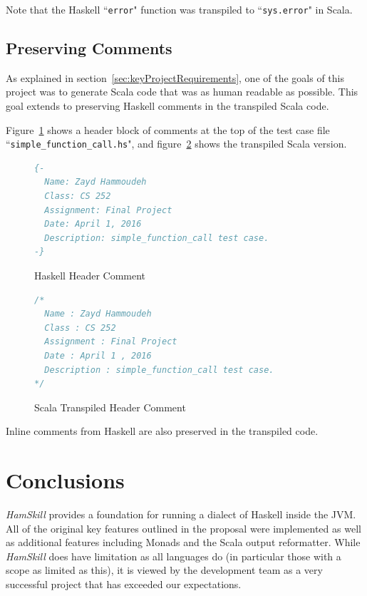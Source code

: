 \documentclass{report}
\begin{document}
Note that the Haskell ``\texttt{error}" function was transpiled to ``\texttt{sys.error}" in Scala.

\subsection{Preserving Comments}\label{sec:preservingComments}

As explained in section~\ref{sec:keyProjectRequirements}, one of the goals of this project was to generate Scala code that was as human readable as possible.  This goal extends to preserving Haskell comments in the transpiled Scala code.

Figure~\ref{fig:haskellHeaderComments} shows a header block of comments at the top of the test case file ``\texttt{simple\_function\_call.hs}", and figure~\ref{fig:scalaHeaderComments} shows the transpiled Scala version.  

\begin{figure}[H]
\begin{mdframed}
\begin{lstlisting}[language=Haskell]
{-
  Name: Zayd Hammoudeh
  Class: CS 252
  Assignment: Final Project
  Date: April 1, 2016
  Description: simple_function_call test case.
-}
\end{lstlisting}
\end{mdframed}
\caption{Haskell Header Comment}\label{fig:haskellHeaderComments}
\end{figure}

\begin{figure}[H]
\begin{mdframed}
\begin{lstlisting}[language=Scala]
/*
  Name : Zayd Hammoudeh
  Class : CS 252
  Assignment : Final Project
  Date : April 1 , 2016
  Description : simple_function_call test case.
*/
\end{lstlisting}
\end{mdframed}
\caption{Scala Transpiled Header Comment}\label{fig:scalaHeaderComments}
\end{figure}

Inline comments from Haskell are also preserved in the transpiled code.

\section{Conclusions}

\textit{HamSkill} provides a foundation for running a dialect of Haskell inside the JVM.  All of the original key features outlined in the proposal were implemented as well as additional features including Monads and the Scala output reformatter.  While \textit{HamSkill} does have limitation as all languages do (in particular those with a scope as limited as this), it is viewed by the development team as a very successful project that has exceeded our expectations.

\pagebreak


\end{document}
